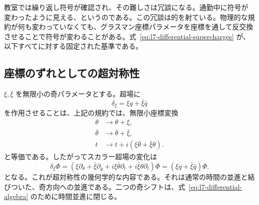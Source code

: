 \begin{classroomqa}
\end{classroomqa}

教室では繰り返し符号が確認され、その難しさは冗談になる。通勤中に符号が変わったように見える、というのである。この冗談は的を射ている。物理的な規約が何も変わっていなくても、グラスマン座標パラメータを座標を通して反交換させることで符号が変わることがある。式~\eqref{eq:l7-differential-supercharges} が、以下すべてに対する固定された基準である。

\subsection{座標のずれとしての超対称性}

\(\xi,\bar\xi\) を無限小の奇パラメータとする。超場に
\begin{equation}
\delta_\xi=\xi q+\bar\xi\bar q
\end{equation}
を作用させることは、上記の規約では、無限小座標変換
\begin{align}
\theta&\longrightarrow\theta+\xi,\\
\bar\theta&\longrightarrow\bar\theta+\bar\xi,\\
t&\longrightarrow t+i\left(\xi\bar\theta+\bar\xi\theta\right).
\label{eq:l7-coordinate-shift}
\end{align}
と等価である。したがってスカラー超場の変化は
\begin{equation}
\delta_\xi\Phi
=\left(\xi\partial_\theta+\bar\xi\partial_{\bar\theta}
+i\xi\bar\theta\partial_t+i\bar\xi\theta\partial_t\right)\Phi
=\left(\xi q+\bar\xi\bar q\right)\Phi.
\end{equation}
となる。これが超対称性の幾何学的な内容である。それは通常の時間の並進と結びついた、奇方向への並進である。二つの奇シフトは、式~\eqref{eq:l7-differential-algebra} のために時間並進に閉じる。

\begin{classroomqa}
\end{classroomqa}

